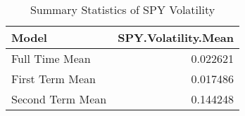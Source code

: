 \begin{table}

\caption{\label{tab:means}Summary Statistics of SPY Volatility}
\centering
\begin{tabular}[t]{l|r}
\hline
Model & SPY.Volatility.Mean\\
\hline
Full Time Mean & 0.022621\\
\hline
First Term Mean & 0.017486\\
\hline
Second Term Mean & 0.144248\\
\hline
\end{tabular}
\end{table}
